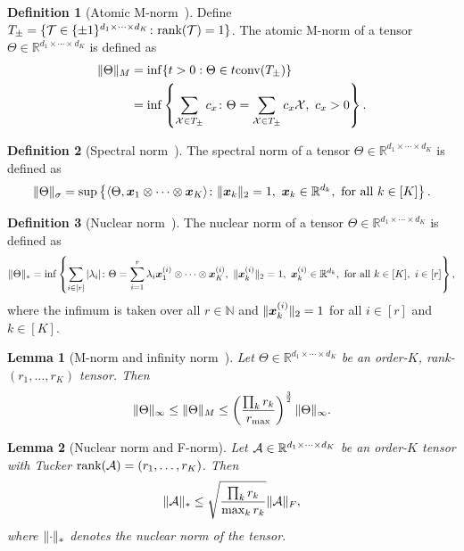 \documentclass{article}
\theoremstyle{plain}
\newtheorem{lem}{Lemma}
\theoremstyle{definition}
\newtheorem{defn}{Definition}
\begin{document}
\begin{defn}[Atomic M-norm~\citep{ghadermarzy2019near}]
Define $T_{\pm}=\{\mathcal{T}\in\{\pm 1 \}^{d_1\times \cdots \times d_K}\colon \text{rank}(\mathcal{T})=1\}$. The atomic M-norm of a tensor $\Theta\in\mathbb{R}^{d_1\times \cdots \times d_K}$ is defined as
\begin{align}
\lVert\Theta\rVert_M&=\inf\{t>0: \Theta\in t\text{conv}(T_{\pm})\}\\
&=\inf\left\{\sum_{\mathcal{X}\in T_{\pm}}c_x\colon \Theta=\sum_{\mathcal{X}\in T_{\pm}} c_x\mathcal{X}, \ c_x>0\right\}.
\end{align}
\end{defn}

\begin{defn}[Spectral norm~\citep{lim2005singular}]
The spectral norm of a tensor $\Theta\in\mathbb{R}^{d_1\times \cdots \times d_K}$ is defined as
\[
\snormSize{}{\Theta}=\sup\left\{\langle \Theta, \mx_1\otimes \cdots \otimes \mx_K\rangle \colon \vnormSize{}{\mx_k}=1,\ \mx_k\in\mathbb{R}^{d_k},\ \text{for all}\ k\in[K]\right\}.
\]
\end{defn}

\begin{defn}[Nuclear norm~\citep{friedland2018nuclear}]
The nuclear norm of a tensor $\Theta\in\mathbb{R}^{d_1\times \cdots \times d_K}$ is defined as
\[
\nnormSize{}{\Theta}=\inf
\left\{
\sum_{i\in[r]}|\lambda_i|\colon \Theta=\sum_{i=1}^r \lambda_i\mx^{(i)}_1\otimes \cdots \otimes \mx^{(i)}_K,\ \vnormSize{}{\mx^{(i)}_k}=1,\ \mx^{(i)}_k\in\mathbb{R}^{d_k},\ \text{for all}\ k\in[K],\ i\in[r]
\right\},
\]
where the infimum is taken over all $r\in\mathbb{N}$ and $\lVert\bm x^{(i)}_k\rVert_2=1$ for all $i\in[r]$ and $k\in[K]$.
\end{defn}



\begin{lem}[M-norm and infinity norm~\citep{ghadermarzy2019near}]\label{lem:Mnormbound}
Let $\Theta\in\mathbb{R}^{d_1\times \cdots \times d_K}$ be an order-$K$, rank-$(r_1,\ldots,r_K)$ tensor. Then
\[
\lVert\Theta\rVert_\infty\leq \lVert\Theta\rVert_M\leq \left(\prod_k r_k \over r_{\max}\right)^{3\over 2} \lVert\Theta\rVert_\infty.
\]
\end{lem}


\begin{lem}[Nuclear norm and F-norm] \label{lem:nuclear}
Let $\mathcal{A}\in\mathbb{R}^{d_1\times\cdots\times d_K}$ be an order-$K$ tensor with Tucker $\text{rank}(\mathcal{A})=(r_1,\ldots,r_K)$. Then
\[
\lVert\mathcal{A}\rVert_* \leq \sqrt{\prod_k r_k\over \max_k r_k} \lVert\mathcal{A}\rVert_F,
\]
where $\lVert\cdot\rVert_*$ denotes the nuclear norm of the tensor.
\end{lem}
\end{document}
